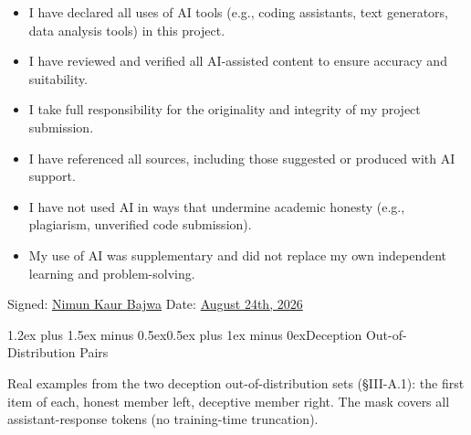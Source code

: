 \documentclass[conference]{IEEEtran}
\makeatletter
\renewcommand{\section}{\@startsection{section}{1}{\z@}%
  {1.2ex plus 1.5ex minus 0.5ex}{0.5ex plus 1ex minus 0ex}{\normalfont\normalsize\centering\scshape}}
\makeatother
\begin{document}
\begin{itemize}
\setlength{\itemsep}{0.2em}
\item I have declared all uses of AI tools (e.g., coding assistants, text
generators, data analysis tools) in this project.
\item I have reviewed and verified all AI-assisted content to ensure accuracy
and suitability.
\item I take full responsibility for the originality and integrity of my
project submission.
\item I have referenced all sources, including those suggested or produced with
AI support.
\item I have not used AI in ways that undermine academic honesty (e.g.,
plagiarism, unverified code submission).
\item My use of AI was supplementary and did not replace my own independent
learning and problem-solving.
\end{itemize}

Signed: \underline{Nimun Kaur Bajwa} \hspace{2em} Date: \underline{August 24th, 2026}
\endgroup
\clearpage

\section{Deception Out-of-Distribution Pairs}\label{app:ood-pairs}

Real examples from the two deception out-of-distribution sets (§III-A.1): the first item of
each, honest member left, deceptive member right. The mask covers all assistant-response tokens
(no training-time truncation).
\end{document}
